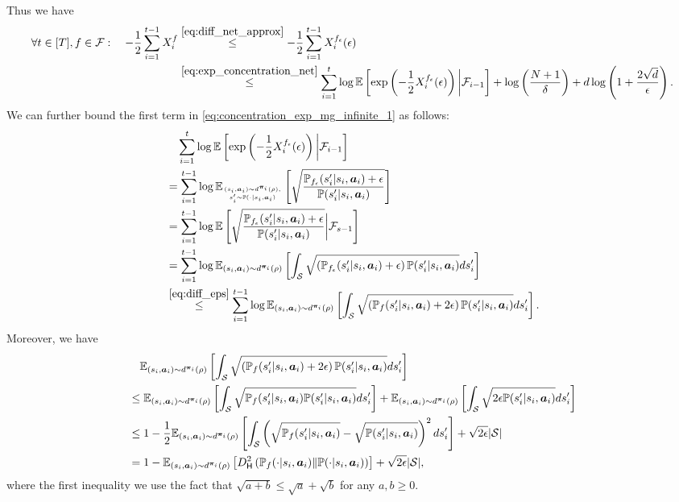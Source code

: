 Thus we have
\begin{align}\label{eq:concentration_exp_mg_infinite_1}
    \forall t\in[T],f\in{\mathcal{F}}:\quad -\frac{1}{2}\sum_{i=1}^{t-1} X_i^f &\overset{\eqref{eq:diff_net_approx}}{\leq} -\frac{1}{2}\sum_{i=1}^{t-1} X^{f_\epsilon}_i(\epsilon)\notag\\
    &\overset{\eqref{eq:exp_concentration_net}}{\leq} \sum_{i=1}^t \log\mathbb{E}\left[\exp\left(-\frac{1}{2}X^{f_\epsilon}_i(\epsilon)\right)\bigg|{\mathcal{F}}_{i-1}\right] + \log\left(\frac{N+1}{\delta}\right) + d\log\left(1+\frac{2\sqrt{d}}{\epsilon}\right).
\end{align}
We can further bound the first term in \eqref{eq:concentration_exp_mg_infinite_1} as follows:
\begin{align}
    &\quad \sum_{i=1}^t \log\mathbb{E}\left[\exp\left(-\frac{1}{2}X^{f_\epsilon}_i(\epsilon)\right)\bigg|{\mathcal{F}}_{i-1}\right]\notag\\
    &= \sum_{i=1}^{t-1} \log\mathbb{E}_{(s_i,{\bm{a}}_i)\sim d^{{\bm{\pi}}_i}(\rho),\atop s_i'\sim{\mathbb P}(\cdot|s_i,{\bm{a}}_i)}\left[\sqrt{\frac{{\mathbb P}_{f_\epsilon}(s'_i|s_i,{\bm{a}}_i)+\epsilon}{{\mathbb P}(s'_i|s_i,{\bm{a}}_i)}}\right]\notag\\
    &= \sum_{i=1}^{t-1} \log\mathbb{E}\left[\sqrt{\frac{{\mathbb P}_{f_\epsilon}(s'_i|s_i,{\bm{a}}_i)+\epsilon}{{\mathbb P}(s'_i|s_i,{\bm{a}}_i)}}\bigg|{\mathcal{F}}_{s-1}\right]\notag\\
    &= \sum_{i=1}^{t-1} \log\mathbb{E}_{(s_i,{\bm{a}}_i)\sim d^{{\bm{\pi}}_i}(\rho)}\left[\int_{\mathcal{S}}\sqrt{\left({\mathbb P}_{f_\epsilon}(s'_i|s_i,{\bm{a}}_i)+\epsilon\right){\mathbb P}(s'_i|s_i,{\bm{a}}_i)} ds_i'\right]\notag\\
    &\overset{\eqref{eq:diff_eps}}{\leq} \sum_{i=1}^{t-1} \log\mathbb{E}_{(s_i,{\bm{a}}_i)\sim d^{{\bm{\pi}}_i}(\rho)}\left[\int_{\mathcal{S}}\sqrt{\left({\mathbb P}_{f}(s'_i|s_i,{\bm{a}}_i)+2\epsilon\right){\mathbb P}(s'_i|s_i,{\bm{a}}_i)} ds_i'\right].
\end{align}
Moreover, we have
\begin{align}\label{eq:construct_Hellinger_infinite}
    &\quad\mathbb{E}_{(s_i,{\bm{a}}_i)\sim d^{{\bm{\pi}}_i}(\rho)}\left[\int_{\mathcal{S}}\sqrt{\left({\mathbb P}_{f}(s'_i|s_i,{\bm{a}}_i)+2\epsilon\right){\mathbb P}(s'_i|s_i,{\bm{a}}_i)} ds_i'\right]\notag\\
    &\leq \mathbb{E}_{(s_i,{\bm{a}}_i)\sim d^{{\bm{\pi}}_i}(\rho)}\left[\int_{\mathcal{S}}\sqrt{{\mathbb P}_{f}(s'_i|s_i,{\bm{a}}_i){\mathbb P}(s'_i|s_i,{\bm{a}}_i)} ds_i'\right] + \mathbb{E}_{(s_i,{\bm{a}}_i)\sim d^{{\bm{\pi}}_i}(\rho)}\left[\int_{\mathcal{S}}\sqrt{2\epsilon{\mathbb P}(s'_i|s_i,{\bm{a}}_i)} ds_i'\right]\notag\\
    &\leq 1-\frac{1}{2}\mathbb{E}_{(s_i,{\bm{a}}_i)\sim d^{{\bm{\pi}}_i}(\rho)}\left[\int_{\mathcal{S}}\left(\sqrt{{\mathbb P}_{f}(s'_i|s_i,{\bm{a}}_i)}-\sqrt{{\mathbb P}(s'_i|s_i,{\bm{a}}_i)} \right)^2 ds_i'\right] + \sqrt{2\epsilon}|{\mathcal{S}}|\notag\\
    &= 1-\mathbb{E}_{(s_i,{\bm{a}}_i)\sim d^{{\bm{\pi}}_i}(\rho)}\left[D_{\mathsf{H}}^2\left({\mathbb P}_{f}(\cdot|s_i,{\bm{a}}_i)\|{\mathbb P}(\cdot|s_i,{\bm{a}}_i)\right)\right] + \sqrt{2\epsilon}|{\mathcal{S}}|,
\end{align}
where the first inequality we use the fact that $\sqrt{a+b}\leq \sqrt{a}+\sqrt{b}$ for any $a,b\geq 0$.

